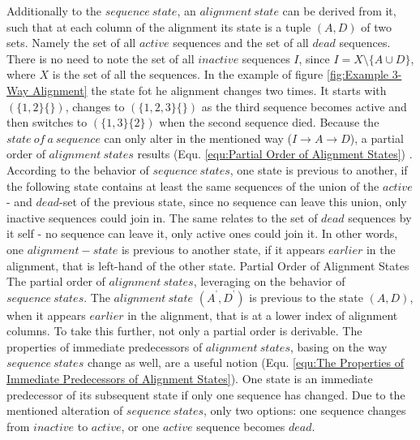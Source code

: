 \documentclass[a4paper,10pt]{thesis}
\newcommand{\dotted}{^{\texttt{'}}}
\newcommand{\pprec}{\mathrel{\prec\!\!\!\!\prec}}
\begin{document}
{{{{        Additionally to the $sequence~state$, an $alignment~state$ can be derived from it, such that at each column of the alignment its state is a tuple $(A,D)$ of two sets. Namely the set of all $active$ sequences and the set of all $dead$ sequences. There is no need to note the set of all $inactive$ sequences $I$, since $I=X\setminus\{A \cup D\}$, where $X$ is the set of all the sequences. In the example of figure \ref{fig:Example 3-Way Alignment}  the state fot he alignment changes two times. It starts with $(\{1,2\}\{\})$, changes to $(\{1,2,3\}\{\})$ as the third sequence becomes active and then switches to $(\{1,3\}\{2\})$ when the second sequence died. Because the $state~of~a~sequence$ can only alter in the mentioned way ($I \rightarrow A \rightarrow D$), a partial order of $alignment~states$ results (Equ. \ref{equ:Partial Order of Alignment States}) . According to the behavior of $sequence~states$, one state is previous to another, if the following state contains at least the same sequences of the union of the $active$- and $dead$-set of the previous state, since no sequence can leave this union, only inactive sequences could join in. The same relates to the set of $dead$ sequences by it self - no sequence can leave it, only active ones could join it. In other words, one $alignment-state$ is previous to another state, if it appears $earlier$ in the alignment, that is left-hand of the other state.
        \newFormula{
          (A\dotted,D\dotted)\preceq(A,D) ~~ \iff ~~ A\dotted \cup D\dotted \subseteq A \cup D ~~and~~ D\dotted \subseteq D
        }
        {Partial Order of Alignment States}
        {The partial order of $alignment~states$, leveraging on the behavior of $sequence~states$. The $alignment~state$ $(A\dotted,D\dotted)$ is previous to the state $(A,D)$, when it appears $earlier$ in the alignment, that is at a lower index of alignment columns.}%
        To take this further, not only a partial order is derivable. The properties of immediate predecessors of $alignment~states$, basing on the way $sequence~states$ change as well, are a useful notion (Equ. \ref{equ:The Properties of Immediate Predecessors of Alignment States}). One state is an immediate predecessor of its subsequent state if only one sequence has changed. Due to the mentioned alteration of $sequence~states$, only two options: one sequence changes from $inactive$ to $active$, or one $active$ sequence becomes $dead$.
        \newFormula{
          (A\dotted,D\dotted) \pprec (A,D) ~~ \iff ~~ \begin{cases}

\end{cases}}}}}}
\end{document}
